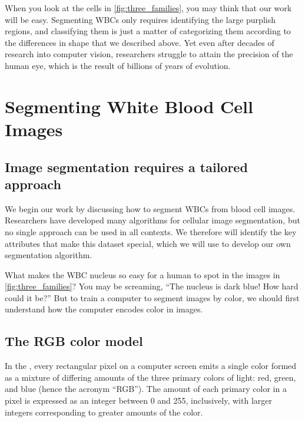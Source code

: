 When you look at the cells in \autoref{fig:three_families}, you may think that our work will be easy. Segmenting WBCs only requires identifying the large purplish regions, and classifying them is just a matter of categorizing them according to the differences in shape that we described above. Yet even after decades of research into computer vision, researchers struggle to attain the precision of the human eye, which is the result of billions of years of evolution.\\

\FloatBarrier
{}

\section{Segmenting White Blood Cell Images}
\label{sec:segmenting_white_blood_cell_images}
\subsection{Image segmentation requires a tailored approach}

We begin our work by discussing how to segment WBCs from blood cell images. Researchers have developed many algorithms for cellular image segmentation, but no single approach can be used in all contexts. We therefore will identify the key attributes that make this dataset special, which we will use to develop our own segmentation algorithm.

What makes the WBC nucleus so easy for a human to spot in the images in \autoref{fig:three_families}? You may be screaming, ``The nucleus is dark blue! How hard could it be?'' But to train a computer to segment images by color, we should first understand how the computer encodes color in images.

\FloatBarrier
{}
\subsection{The RGB color model}

In the , every rectangular pixel on a computer screen emits a single color formed as a mixture of differing amounts of the three primary colors of light: red, green, and blue (hence the acronym ``RGB''). The amount of each primary color in a pixel is expressed as an integer between 0 and 255, inclusively, with larger integers corresponding to greater amounts of the color.

